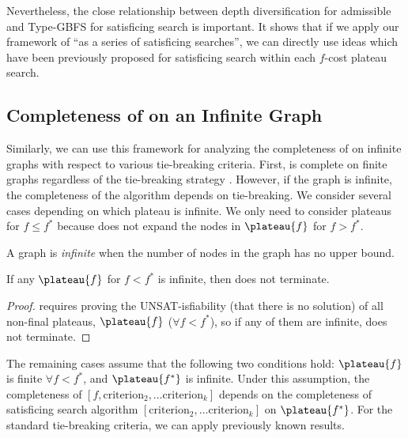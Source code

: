 Nevertheless, the close relationship between depth diversification for admissible \astar and Type-GBFS for satisficing search is important. It shows that if we apply our framework of ``\astar as a series of satisficing searches'', we can directly use ideas which have been previously proposed for satisficing search within each $f$-cost plateau search.

\subsection{Completeness of \astar on an Infinite Graph}
\label{sec:completeness-on-infinite-space}

Similarly, we can use this framework for analyzing the completeness of \astar on infinite graphs with respect to various tie-breaking criteria.
First, \astar is complete on finite graphs regardless of the tie-breaking strategy \cite{hart1968formal}.
However, if the graph is infinite, the completeness of the algorithm depends on tie-breaking.
We consider several cases depending on which plateau is infinite.
 We only need to consider plateaus for $f \leq f^*$ because  \astar does not expand the nodes in $\plateau{f}$ for $f>f^*$.

\begin{defi}
 A graph is \emph{infinite} when the number of nodes in the graph has no upper bound.
\end{defi}

\begin{propo}
 \label{propo:f-less}
 If any $\plateau{f}$ for $f<f^*$ is infinite, then \astar does not terminate.
\end{propo}

\begin{proof}
  requires proving the UNSAT-isfiability (that there is no solution) of all non-final plateaus, $\plateau{f}$ ($\forall f<f^*$), so if any of them are infinite, \astar does not terminate.
\end{proof}

The remaining cases assume that the following two conditions hold: 
 $\plateau{f}$ is finite  $\forall f<f^*$, and $\plateau{f^*}$ is infinite.
Under this assumption,
the completeness of \astar $[f, \text{criterion}_2, \ldots \text{criterion}_k]$
depends on the completeness of satisficing search algorithm
$[\text{criterion}_2, \ldots \text{criterion}_k]$ on $\plateau{f^*}$.
For the standard tie-breaking criteria, we can apply previously known results.

